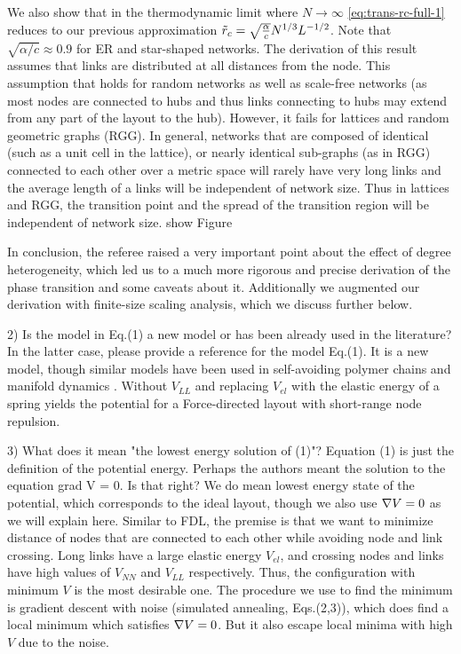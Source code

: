 \documentclass[11pt]{article}
\begin{document}
\begin{response}
We also show that in the thermodynamic limit where $N\to \infty$ \eqref{eq:trans-rc-full-1} reduces to our previous approximation $\tilde{r}_c = \sqrt{{\alpha \over c}} N^{1/3}L^{-1/2}$. 
Note that $\sqrt{\alpha/c} \approx 0.9$ for ER and star-shaped networks. 
The derivation of this result assumes that links are distributed at all distances from the node. 
This assumption that holds for random networks as well as scale-free networks (as most nodes are connected to hubs and thus links connecting to hubs may extend from any part of the layout to the hub). However, it fails for lattices and random geometric graphs (RGG). 
In general, networks that are composed of identical (such as a unit cell in the lattice), or nearly identical sub-graphs (as in RGG) connected to each other over a metric space will rarely have very long links and the average length of a links will be independent of network size. 
Thus in lattices and RGG, the transition point and the spread of the transition region will be independent of network size. 
{\color{red} show Figure}

In conclusion, the referee raised a very important point about the effect of degree heterogeneity, which led us to a much more rigorous and precise derivation of the phase transition and some caveats about it. 
Additionally we augmented our derivation with finite-size scaling analysis, which we discuss further below.

\end{response}
\begin{response}{
2) Is the model in Eq.(1) a new model or has been already used in the literature? In the latter case, please provide a reference for the model Eq.(1). 
}
It is a new model, though similar models have been used in self-avoiding polymer chains \cite{des1974lagrangian} and manifold dynamics \cite{mezard1991replica}. 
Without $V_{LL}$ and replacing $V_{el}$ with the elastic energy of a spring yields the potential for a Force-directed layout with short-range node repulsion.  
\end{response}
\begin{response}{
3) What does it mean "the lowest energy solution of (1)"? Equation (1) is just the definition of the potential energy. Perhaps the authors meant the solution to the equation grad V = 0. Is that right?
}
We do mean lowest energy state of the potential, which corresponds to the ideal layout, though we also use $\nabla V=0$ as we will explain here. 
Similar to FDL, the premise is that we want to minimize distance of nodes that are connected to each other while avoiding node and link crossing. 
Long links have a large elastic energy $V_{el}$, and crossing nodes and links have high values of $V_{NN}$ and $V_{LL}$ respectively. 
Thus, the configuration with minimum $V$ is the most desirable one. 
The procedure we use to find the minimum is gradient descent with noise (simulated annealing, Eqs.(2,3)), which does find a local minimum which satisfies $\nabla V = 0$. 
But it also escape local minima with high $V$ due to the noise. 
\end{response}
\end{document}
